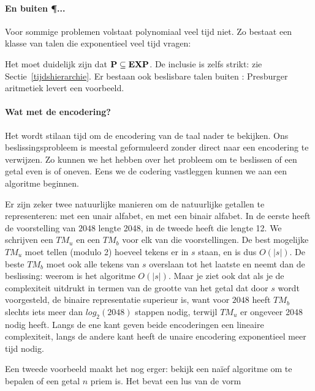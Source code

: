 \paragraph{En buiten \P ...} 
Voor sommige problemen volstaat polynomiaal veel tijd niet. Zo bestaat
een klasse van talen die exponentieel veel tijd vragen:


Het moet duidelijk zijn dat ${\bf P} \subseteq {\bf EXP}$. De inclusie is zelfs
strikt: zie Sectie~\ref{tijdshierarchie}.
%
Er bestaan ook beslisbare talen buiten \EXP: Presburger aritmetiek
levert een voorbeeld.

\paragraph{Wat met de encodering?}
Het wordt stilaan tijd om de encodering van de taal nader te
bekijken. Ons beslissingsprobleem is meestal geformuleerd zonder
direct naar een encodering te verwijzen. Zo kunnen we het hebben over
het probleem om te beslissen of een getal even is of oneven. Eens we
de codering vastleggen kunnen we aan een algoritme beginnen.

Er zijn zeker twee natuurlijke manieren om de natuurlijke getallen
te representeren: met een unair alfabet, en met een binair alfabet. In
de eerste heeft de voorstelling van $2048$ lengte 2048, in de tweede
heeft die lengte 12. We schrijven een $TM_u$ en een $TM_b$ voor elk van
die voorstellingen. De best mogelijke $TM_u$ moet tellen (modulo 2)
hoeveel tekens er in $s$ staan, en is dus $O(|s|)$. De beste $TM_b$
moet ook alle tekens van $s$ overslaan tot het laatste en neemt dan de
beslissing: weerom is het algoritme $O(|s|)$. Maar je ziet ook dat als
je de complexiteit uitdrukt in termen van de grootte van het getal dat
door $s$ wordt voorgesteld, de binaire representatie superieur is,
want voor $2048$ heeft $TM_b$ slechts iets meer dan $log_2(2048)$
stappen nodig, terwijl $TM_u$ er ongeveer 2048 nodig heeft. Langs de
ene kant geven beide encoderingen een lineaire complexiteit, langs de
andere kant heeft de unaire encodering exponentieel meer tijd nodig.

Een tweede voorbeeld maakt het nog erger: bekijk een na\"ief algoritme
om te bepalen of een getal $n$ priem is. Het bevat een lus van de vorm

\begin{algorithmic}
         \EndIf
    \EndWhile
\end{algorithmic}



